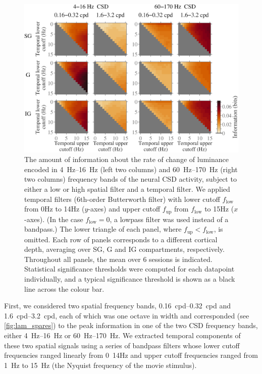 \begin{figure}[htbp]
\centering
\includegraphics[scale=.5]{figs/tmf/tmf-v-tmf-sggig-avg-tmfres1b-2Band-2Crs.eps}
%
\caption{
The amount of information about the rate of change of luminance encoded in \SIrange{4}{16}{Hz} (left two columns) and \SIrange{60}{170}{Hz} (right two columns) frequency bands of the neural \ac{CSD} activity, subject to either a low or high spatial filter and a temporal filter.
We applied temporal filters (6th-order Butterworth filter) with lower cutoff $f_\text{low}$ from \num{0}{Hz} to \num{14}{Hz} ($y$-axes) and upper cutoff $f_\text{up}$ from $f_\text{low}$ to \num{15}{Hz} ($x$-axes).
(In the case $f_\text{low} = 0$, a lowpass filter was used instead of a bandpass.)
The lower triangle of each panel, where $f_\text{up} < f_\text{low}$, is omitted.
Each row of panels corresponds to a different cortical depth, averaging over \ac{SG}, \ac{G} and \ac{IG} compartments, respectively.
Throughout all panels, the mean over \num{6} sessions is indicated.
Statistical significance thresholds were computed for each datapoint individually, and a typical significance threshold is shown as a black line across the colour bar.
}
\label{fig:lam_tmf}
%
\end{figure}

First, we considered two spatial frequency bands, \SIrange{0.16}{0.32}{cpd} and \SIrange{1.6}{3.2}{cpd}, each of which was one octave in width and corresponded (see \autoref{fig:lam_spares}) to the peak information in one of the two \ac{CSD} frequency bands, either \SIrange{4}{16}{Hz} or \SIrange{60}{170}{Hz}.
We extracted temporal components of these two spatial signals using a series of bandpass filters whose lower cutoff frequencies ranged linearly from \SI{0}{14}{Hz} and upper cutoff frequencies ranged from \SI{1}{Hz} to \SI{15}{Hz} (the Nyquist frequency of the movie stimulus).

